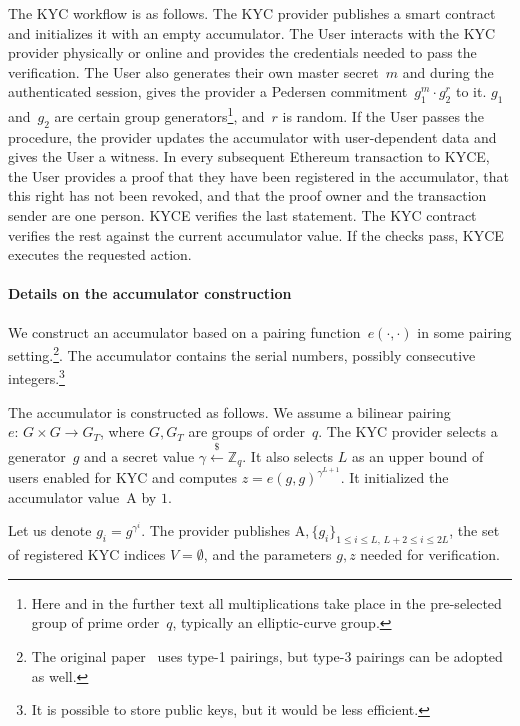 The KYC workflow is as follows.
The KYC provider publishes a smart contract and initializes it with an empty accumulator.
The User interacts with the KYC provider physically or online and provides the credentials needed to pass the verification.
The User also generates their own master secret~$m$ and during the authenticated session, gives the provider a Pedersen commitment~$g_1^m\cdot g_2^r$ to it.
$g_1$ and~$g_2$ are certain group generators\footnote{Here and in the further text all multiplications take place in the pre-selected group of prime order~$q$, typically an elliptic-curve group.}, and~$r$ is random.
If the User passes the procedure, the provider updates the accumulator with user-dependent data and gives the User a witness.
In every subsequent Ethereum transaction to KYCE, the User provides a proof that they have been registered in the accumulator, that this right has not been revoked, and that the proof owner and the transaction sender are one person.
KYCE verifies the last statement.
The KYC contract verifies the rest against the current accumulator value.
If the checks pass, KYCE executes the requested action.

\paragraph{Details on the accumulator construction}
We construct an accumulator based on a pairing function~$e(\cdot,\cdot)$ in some pairing setting.\footnote{The original paper~\cite{Camenisch2009} uses type-1 pairings, but type-3 pairings can be adopted as well.}.
The accumulator contains the serial numbers, possibly consecutive integers.\footnote{It is possible to store public keys, but it would be less efficient.}

The accumulator is constructed as follows.
We assume a bilinear pairing~$e:\,G\times G\rightarrow G_T$, where $G,G_T$ are groups of order~$q$.
The KYC provider selects a generator~$g$ and a secret value $\gamma\overset{\$}{\leftarrow} \mathbb{Z}_q$.
It also selects $L$ as an upper bound of users enabled for KYC and computes $z = e(g,g)^{\gamma^{L+1}}$.
It initialized the accumulator value~$\mathrm{A}$ by $1$.

Let us denote $g_i = g^{\gamma^i}$.
The provider publishes $\mathrm{A},\{g_i\}_{1\leq i\leq L, \,L+2\leq i \leq 2L}$, the set of registered KYC indices $V=\emptyset$, and the parameters $g,z$ needed for verification.


